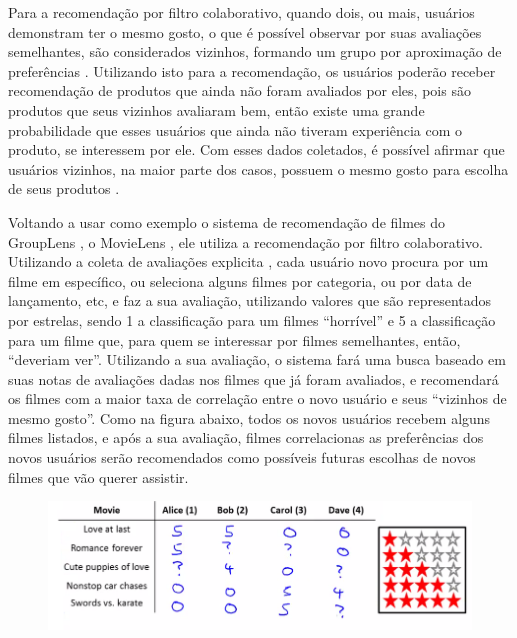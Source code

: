 \documentclass[12pt,
				openright,
				twoside,
				a4paper,
				apter=TITLE,
				section=TITLE,
				subsection=TITLE,
				chapter=TITLE,
				english,
				brazil]{abntex2}
\begin{document}
Para a recomendação por filtro colaborativo, quando dois, ou mais, usuários demonstram ter o mesmo gosto, o que é possível observar por suas avaliações semelhantes, são considerados vizinhos, formando um grupo por aproximação de preferências \cite{asanov2011algorithms}. Utilizando isto para a recomendação, os usuários poderão receber recomendação de produtos que ainda não foram avaliados por eles, pois são produtos que seus vizinhos avaliaram bem, então existe uma grande probabilidade que esses usuários que ainda não tiveram experiência com o produto, se interessem por ele. Com esses dados coletados, é possível afirmar que usuários vizinhos, na maior parte dos casos, possuem o mesmo gosto para escolha de seus produtos \cite{miller2003movielens}.

Voltando a usar como exemplo o sistema de recomendação de filmes do GroupLens \cite{resnick1994grouplen} \cite{konstan1997grouplens}, o MovieLens \cite{miller2003movielens}, ele utiliza a recomendação por filtro colaborativo. Utilizando a coleta de avaliações explicita \cite{melville2010recommender}, cada usuário novo procura por um filme em específico, ou seleciona alguns filmes por categoria, ou por data de lançamento, etc, e faz a sua avaliação, utilizando valores que são representados por estrelas, sendo 1 a classificação para um filmes ``horrível'' e 5 a classificação para um filme que, para quem se interessar por filmes semelhantes, então, ``deveriam ver''. Utilizando a sua avaliação, o sistema fará uma busca baseado em suas notas de avaliações dadas nos filmes que já foram avaliados, e recomendará os filmes com a maior taxa de correlação entre o novo usuário e seus ``vizinhos de mesmo gosto''. Como na figura abaixo, todos os novos usuários recebem alguns filmes listados, e após a sua avaliação, filmes correlacionas as preferências dos novos usuários serão recomendados como possíveis futuras escolhas de novos filmes que vão querer assistir.

\begin{figure}
\centering
\includegraphics[scale=0.4]{img/rate}
\end{figure}
\end{document}
